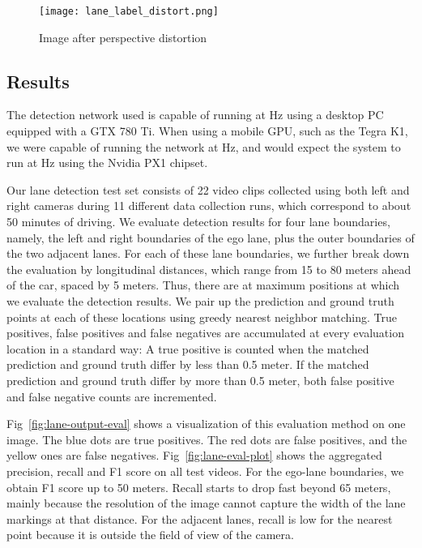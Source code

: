 \documentclass[journal]{IEEEtran}
\begin{document}
\begin{figure}[tb]
  \centering
    \texttt{[image: lane\_label\_distort.png]}
 \caption{Image after perspective distortion}
 \label{fig:lane-gt-distort}
\end{figure}



\subsection{Results}
The detection network used is capable of running at Hz using a desktop PC equipped with a GTX 780 Ti. When using a mobile GPU, such as the Tegra K1, we were capable of running the network at Hz, and would expect the system to run at Hz using the Nvidia PX1 chipset. 

Our lane detection test set consists of 22 video clips collected using both left and right cameras during 11 different data collection runs, which correspond to about 50 minutes of driving. We evaluate detection results for four lane boundaries, namely, the left and right boundaries of the ego lane, plus the outer boundaries of the two adjacent lanes. For each of these lane boundaries, we further break down the evaluation by longitudinal distances, which range from 15 to 80 meters ahead of the car, spaced by 5 meters. Thus, there are at maximum  positions at which we evaluate the detection results. We pair up the prediction and ground truth points at each of these locations using greedy nearest neighbor matching. True positives, false positives and false negatives are accumulated at every evaluation location in a standard way: A true positive is counted when the matched prediction and ground truth differ by less than 0.5 meter. If the matched prediction and ground truth differ by more than 0.5 meter, both false positive and false negative counts are incremented.

Fig~\ref{fig:lane-output-eval} shows a visualization of this evaluation method on one image. The blue dots are true positives. The red dots are false positives, and the yellow ones are false negatives. Fig~\ref{fig:lane-eval-plot} shows the aggregated precision, recall and F1 score on all test videos. For the ego-lane boundaries, we obtain  F1 score up to 50 meters. Recall starts to drop fast beyond 65 meters, mainly because the resolution of the image cannot capture the width of the lane markings at that distance. For the adjacent lanes, recall is low for the nearest point because it is outside the field of view of the camera.
\end{document}
